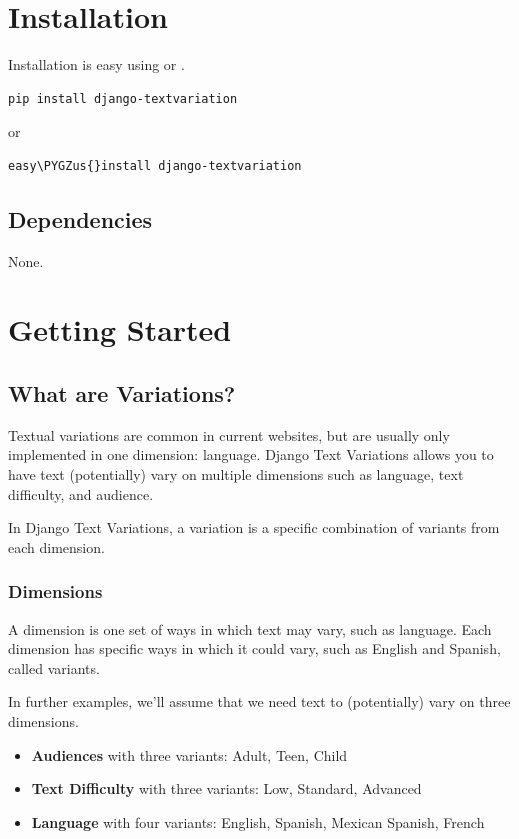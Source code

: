 \documentclass[letterpaper,10pt,english]{sphinxmanual}
\def\PYGZus{\char`\_}
\begin{document}
\chapter{Installation}
\label{installation:installation}\label{installation::doc}
Installation is easy using  or .

\begin{Verbatim}[commandchars=\\\{\}]
pip install django-textvariation
\end{Verbatim}

or

\begin{Verbatim}[commandchars=\\\{\}]
easy\PYGZus{}install django-textvariation
\end{Verbatim}


\section{Dependencies}
\label{installation:dependencies}
None.


\chapter{Getting Started}
\label{getting_started:getting-started}\label{getting_started::doc}

\section{What are Variations?}
\label{getting_started:what-are-variations}
Textual variations are common in current websites, but are usually only implemented in one dimension: language. Django Text Variations allows you to have text (potentially) vary on multiple dimensions such as language, text difficulty, and audience.

In Django Text Variations, a variation is a specific combination of variants from each dimension.


\subsection{Dimensions}
\label{getting_started:dimensions}
A dimension is one set of ways in which text may vary, such as language. Each dimension has specific ways in which it could vary, such as English and Spanish, called variants.

In further examples, we'll assume that we need text to (potentially) vary on three dimensions.
\begin{itemize}
\item {} 
\textbf{Audiences} with three variants: Adult, Teen, Child

\item {} 
\textbf{Text Difficulty} with three variants: Low, Standard, Advanced

\item {} 
\textbf{Language} with four variants: English, Spanish, Mexican Spanish, French

\end{itemize}
\end{document}
